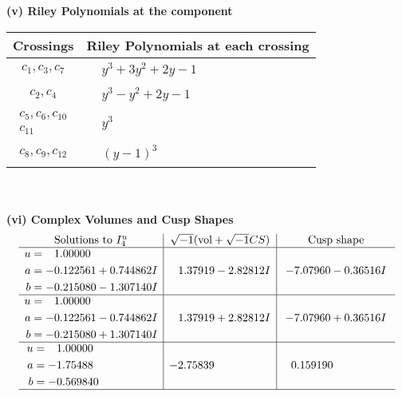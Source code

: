 \documentclass[1p]{elsarticle_modified}
\theoremstyle{definition}
\newcommand{\I}{\sqrt{-1}}
\begin{document}
\newpage\renewcommand{\arraystretch}{1}
\flushleft \textbf{(v) Riley Polynomials at the component}\newline \\
\begin{tabular}{m{50pt}|m{274pt}}
Crossings & \hspace{64pt}Riley Polynomials at each crossing \\
\hline $$\begin{aligned}c_{1},c_{3},c_{7}\end{aligned}$$&$\begin{aligned}
&y^3+3 y^2+2 y-1
\end{aligned}$\\
\hline $$\begin{aligned}c_{2},c_{4}\end{aligned}$$&$\begin{aligned}
&y^3- y^2+2 y-1
\end{aligned}$\\
\hline $$\begin{aligned}c_{5},c_{6},c_{10}\\c_{11}\end{aligned}$$&$\begin{aligned}
&y^3
\end{aligned}$\\
\hline $$\begin{aligned}c_{8},c_{9},c_{12}\end{aligned}$$&$\begin{aligned}
&(y-1)^3
\end{aligned}$\\
\hline
\end{tabular}\\~\\
\newpage\flushleft \textbf{(vi) Complex Volumes and Cusp Shapes}
$$\begin{array}{c|c|c}  
\text{Solutions to }I^u_{4}& \I (\text{vol} + \sqrt{-1}CS) & \text{Cusp shape}\\
 \hline 
\begin{aligned}
u &= \phantom{-}1.00000\phantom{ +0.000000I} \\
a &= -0.122561 + 0.744862 I \\
b &= -0.215080 - 1.307140 I\end{aligned}
 & \phantom{-}1.37919 - 2.82812 I & -7.07960 - 0.36516 I \\ \hline\begin{aligned}
u &= \phantom{-}1.00000\phantom{ +0.000000I} \\
a &= -0.122561 - 0.744862 I \\
b &= -0.215080 + 1.307140 I\end{aligned}
 & \phantom{-}1.37919 + 2.82812 I & -7.07960 + 0.36516 I \\ \hline\begin{aligned}
u &= \phantom{-}1.00000\phantom{ +0.000000I} \\
a &= -1.75488\phantom{ +0.000000I} \\
b &= -0.569840\phantom{ +0.000000I}\end{aligned}
 & -2.75839\phantom{ +0.000000I} & \phantom{-}0.159190\phantom{ +0.000000I}\\
 \hline 
 \end{array}$$\newpage
\end{document}
